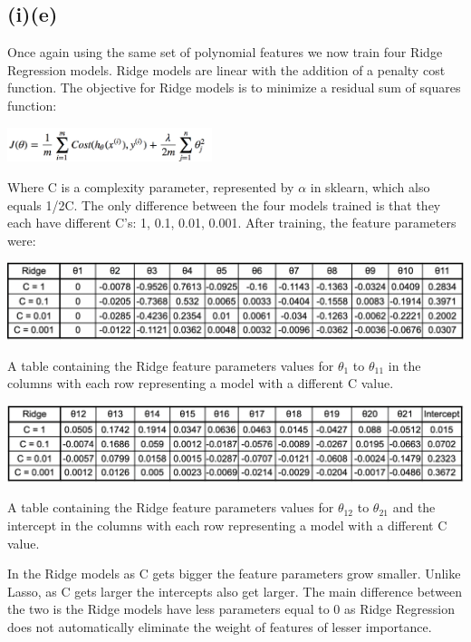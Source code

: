 \documentclass{article}
\begin{document}
\subsection{(i)(e)}
Once again using the same set of polynomial features we now train four Ridge Regression models. Ridge models are linear with the addition of a penalty cost function. The objective for Ridge models is to minimize a residual sum of squares function:
\begin{center}
\includegraphics[width=.3\linewidth, height=1cm]{f2.png}
\end{center}
Where C is a complexity parameter, represented by $\alpha$ in sklearn, which also equals 1/2C.
The only difference between the four models trained is that they each have different C's: 1, 0.1, 0.01, 0.001. After training, the feature parameters were:
\begin{center}
\includegraphics[width=\linewidth]{t3.png}
\caption{A table containing the Ridge feature parameters values for $\theta_1$  to  $\theta_{11}$  in the columns with each row representing a model with a different C value.}
\end{center}
\begin{center}
\includegraphics[width=\linewidth]{t4.png}
\caption{A table containing the Ridge feature parameters values for $\theta_12$  to  $\theta_{21}$ and the intercept in the columns with each row representing a model with a different C value.}
\end{center}

In the Ridge models as C gets bigger the feature parameters grow smaller. Unlike Lasso, as C gets larger the intercepts also get larger. The main difference between the two is the Ridge models have less parameters equal to 0 as Ridge Regression does not automatically eliminate the weight of features of lesser importance.
\end{document}

